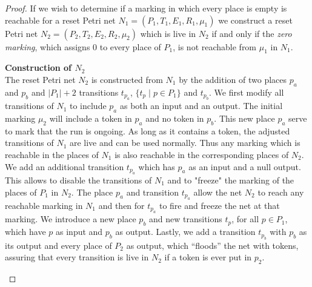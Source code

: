 \documentclass[runningheads]{llncs}
\begin{document}
\begin{proof}


If we wish to determine if a marking in which every place is empty is reachable for a reset Petri net
 $N_1 = (P_1, T_1, E_1, R_1, \mu_1)$ 
 we construct a reset Petri net
 $N_2 = (P_2, T_2, E_2, R_2, \mu_2)$ 
  which is live in $N_2$ if and only if the {\em zero marking}, which assigns $0$ to every place of $P_1$, is not reachable from $\mu_1$ in $N_1$. \\

\begin{samepage}
{\bf Construction of $N_2$} \\
\indent
The reset Petri net $N_2$ is constructed from $N_1$ by the addition of two places $p_a$ and $p_b$ and $|P_1| +2$ transitions $t_{p_a}$, $\{ t_p \mid p \in P_1 \}$ and $t_{p_b}$.
We first modify all transitions of $N_1$ to include $p_a$ as both an input and an output.
The initial marking $\mu_2$ will include a token in $p_a$ and no token in $p_b$. 
This new place $p_a$ serve to mark that the run is ongoing. As long as it contains a token, the adjusted transitions of $N_1$ are live and can be used normally. Thus any marking which is reachable in the places of $N_1$ is also reachable in the corresponding places of $N_2$.
We add an additional transition $t_{p_a}$ 
which has $p_a$ as an input and a null output.
This allows to disable the transitions of $N_1$ and to "freeze" the marking of the places of $P_1$ in $N_2$.
 The place $p_a$ and transition $t_{p_a}$ allow the net $N_2$ to reach any reachable marking in $N_1$ and then for $t_{p_a}$ to fire and freeze the net at that marking.
We introduce a new place $p_b$ and new transitions $t_p$, for all $p \in P_1$, which have $p$ as input and $p_b$ as output.
Lastly, we add a transition $t_{p_b}$ with $p_b$ as its output and every place of $P_2$ as output, which ``floods'' the net with tokens, assuring that every transition is live in $N_2$ if a token is ever
put in $p_2$.
\end{samepage}


\end{proof}
\end{document}
